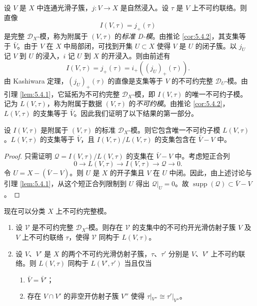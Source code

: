 设 $V$ 是 $X$ 中连通光滑子簇，$j:V\to X$ 是自然浸入。设 $\tau$ 是 $V$ 上不可约联络。则直像
$$I(V,\tau)=j_+(\tau)$$
是完整 $\mathcal{D}_X$-模，称为附属于 $(V,\tau)$ 的\emph{标准 D-模}。由推论 \ref{cor:5.4.2}，其支集等于 $\bar{V}$。由于 $V$ 在 $X$ 中局部闭，可找到开集 $U\subset X$ 使得 $V$ 是 $U$ 的闭子簇。以 $j_U$ 记 $V$ 到 $U$ 的浸入，$i$ 记 $U$ 到 $X$ 的开浸入。则由前述有
$$I(V,\tau)=j_+(\tau)=i_+((j_U)_+(\tau)).$$
由 Kashiwara 定理，$(j_U)_+(\tau)$ 的直像是支集等于 $V$ 的不可约完整 $\mathcal{D}_U$-模。由引理 \ref{lem:5.4.1}，它延拓为不可约完整 $\mathcal{D}_X$-模，即 $I(V,\tau)$ 的唯一不可约子模。记为 $L(V,\tau)$，称为附属于数据 $(V,\tau)$ 的\emph{不可约模}。由推论 \ref{cor:5.4.2}，$L(V,\tau)$ 的支集等于 $\bar{V}$。因此我们证明了以下结果的第一部分。

\begin{proposition}\label{prop:5.4.3}
设 $I(V,\tau)$ 是附属于 $(V,\tau)$ 的标准 $\mathcal{D}_X$-模。则它包含唯一不可约子模 $L(V,\tau)$。$L(V,\tau)$ 的支集等于 $\bar{V}$，且 $I(V,\tau)/L(V,\tau)$ 的支集包含在 $\bar{V}-V$ 中。
\end{proposition}

\begin{proof}
只需证明 $\mathcal{Q}=I(V,\tau)/L(V,\tau)$ 的支集在 $\bar{V}-V$ 中。考虑短正合列
$$0\longrightarrow L(V,\tau)\longrightarrow I(V,\tau)\longrightarrow\mathcal{Q}\longrightarrow0.$$
令 $U=X-(\bar{V}-V)$。则 $U$ 是 $X$ 的开子集且 $V$ 在 $U$ 中闭。因此，由上述讨论与引理 \ref{lem:5.4.1}，从这个短正合列限制到 $U$ 得出 $\mathcal{Q}|_U=0$。故 $\operatorname{supp}(\mathcal{Q})\subset\bar{V}-V$。
\end{proof}

现在可以分类 $X$ 上不可约完整模。

\begin{theorem}\label{thm:5.4.4}
\begin{enumerate}[label=(\roman*)]
  \item 设 $\mathcal{V}$ 是不可约完整 $\mathcal{D}_X$-模。则存在 $\mathcal{V}$ 的支集中的不可约开光滑仿射子簇 $V$ 及 $V$ 上不可约联络 $\tau$，使得 $\mathcal{V}$ 同构于 $L(V,\tau)$。
  \item 设 $V$、$V'$ 是 $X$ 的两个不可约光滑仿射子簇，$\tau$、$\tau'$ 分别是 $V$、$V'$ 上不可约联络。则 $L(V,\tau)$ 同构于 $L(V',\tau')$ 当且仅当
    \begin{enumerate}[label=(\alph*)]
      \item $\bar{V}=\bar{V}'$；
      \item 存在 $V\cap V'$ 的非空开仿射子簇 $V''$ 使得 $\tau|_{V''}\cong\tau'|_{V''}$。
    \end{enumerate}
\end{enumerate}
\end{theorem}

